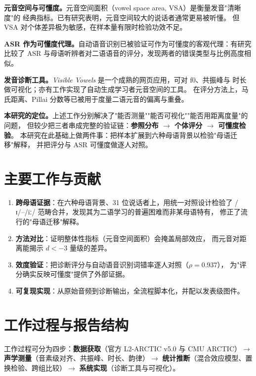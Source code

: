 \documentclass[12pt,a4paper,fontset=fandol]{ctexrep}
\newcommand{\ipa}[1]{/#1/}
\begin{document}
\textbf{元音空间与可懂度。}元音空间面积（vowel space area, VSA）是衡量发音"清晰度"的
经典指标。已有研究表明，元音空间较大的说话者通常更易被听懂\cite{bradlow1996}。
但 VSA 对个体差异极为敏感，在样本量有限时检验功效不足。

\textbf{ASR 作为可懂度代理。}自动语音识别已被验证可作为可懂度的客观代理：有研究比较了
ASR 与母语听辨者对二语语音的评分，发现两者的错误类型与比例高度相似\cite{recallasr}。

\textbf{发音诊断工具。}\textit{Visible Vowels} 是一个成熟的网页应用，可对 f0、共振峰与
时长做可视化\cite{visiblevowels}；亦有工作实现了自动生成学习者元音空间的工具\cite{vowspace}。
在评分方法上，马氏距离、Pillai 分数等已被用于度量二语元音的偏离与重叠\cite{icphs2023}。

\textbf{本研究的定位。}上述工作分别解决了"能否测量""能否可视化""能否用距离度量"的问题，
但较少把三者串成完整的验证链：\textbf{参照分布 $\rightarrow$ 个体评分 $\rightarrow$ 可懂度检验}。
本研究在此基础上做两件事：把样本扩展到六种母语背景以检验"母语迁移"解释，
并把评分与 ASR 可懂度做逐人对照。

\section{主要工作与贡献}

\begin{enumerate}[leftmargin=2em,itemsep=2pt]
  \item \textbf{跨母语证据}：在六种母语背景、31 位说话者上，用统一对照设计检验了
        \ipa{ɪ}–\ipa{iː} 范畴合并，发现其为二语学习的普遍困难而非某母语特有，
        修正了流行的"母语迁移"解释。
  \item \textbf{方法对比}：证明整体性指标（元音空间面积）会掩盖局部效应，
        而元音对距离能揭示 $d<-3$ 量级的差异。
  \item \textbf{效度验证}：把诊断评分与自动语音识别词错率逐人对照（$\rho=0.937$），
        为"评分确实反映可懂度"提供了外部证据。
  \item \textbf{可复现实现}：从原始音频到诊断输出，全流程脚本化，并配以发表级图件。
\end{enumerate}

\section{工作过程与报告结构}

工作过程可分为四步：\textbf{数据获取}（官方 L2-ARCTIC v5.0 与 CMU ARCTIC）$\rightarrow$
\textbf{声学测量}（音素级对齐、共振峰、时长、韵律）$\rightarrow$
\textbf{统计推断}（混合效应模型、置换检验、跨组比较）$\rightarrow$
\textbf{系统实现}（诊断工具与可视化）。
\end{document}
